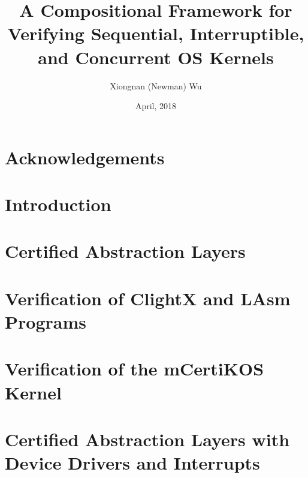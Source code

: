 \documentclass[letterpaper,11pt]{yalephd}
\begin{document}
\title{A Compositional Framework for Verifying Sequential, Interruptible, and Concurrent OS Kernels}
\author{Xiongnan (Newman) Wu}
\date{April, 2018} %

\frontmatter

\begin{abstract}

\end{abstract}


\maketitle
{} %
\tableofcontents
\listoffigures %
\listoftables %

\chapter{Acknowledgements} %


\mainmatter

\chapter{Introduction}

\chapter{Certified Abstraction Layers}
\label{chapter:framework}


\chapter{Verification of ClightX and LAsm Programs}
\label{chapter:automation}


\chapter{Verification of the mCertiKOS Kernel}
\label{chapter:sequential}


\chapter{Certified Abstraction Layers with Device Drivers and Interrupts}
\label{chapter:driver}
\end{document}
